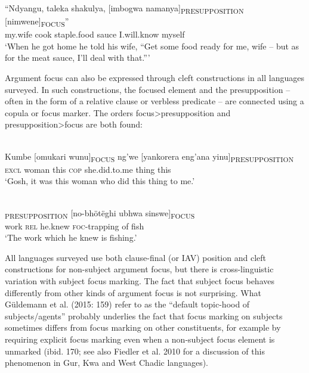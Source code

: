 \documentclass[output=paper]{langsci/langscibook}
\begin{document}
\gll “Ndyangu, taleka shakulya, [imbogwa namanya]\textsubscript{PRESUPPOSITION} [nimwene]\textsubscript{FOCUS}”\\
my.wife cook staple.food sauce I.will.know myself\\


\glt \textup{‘When he got home he told his wife,}\textup{ “Get some food ready for me, wife – but as for the meat sauce, I’ll deal with that.”}\textup{’}
\z

Argument focus can also be expressed through cleft constructions in all languages surveyed. In such constructions, the focused element and the presupposition – often in the form of a relative clause or verbless predicate – are connected using a copula or focus marker. The orders focus{\textgreater}presupposition and presupposition{\textgreater}focus are both found:

\ea\label{ex:}
\\
\gll Kumbe [omukari wunu]\textsubscript{FOCUS} ng’we [yankorera eng’ana yinu]\textsubscript{PRE}\textsubscript{SUPPOSITION}\\
\textsc{excl} woman this \textsc{cop} she.did.to.me thing this\\


\upshape
‘Gosh, it was this woman who did this thing to me.’
\z

\ea\label{ex:}
\\
\textsubscript{PRESUPPOSITION} [no-bhötëghi ubhwa sinswe]\textsubscript{FOCUS}\\
work \textsc{rel }he.knew \textsc{foc}{}-trapping of fish\\


\upshape
‘The work which he knew is fishing.’
\z

All languages surveyed use both clause-final (or IAV) position and cleft constructions for non-subject argument focus, but there is cross-linguistic variation with subject focus marking. The fact that subject focus behaves differently from other kinds of argument focus is not surprising. What Güldemann et al. (2015: 159) refer to as the “default topic-hood of subjects/agents” probably underlies the fact that focus marking on subjects sometimes differs from focus marking on other constituents, for example by requiring explicit focus marking even when a non-subject focus element is unmarked (ibid. 170; see also Fiedler et al. 2010 for a discussion of this phenomenon in Gur, Kwa and West Chadic languages).
\end{document}
